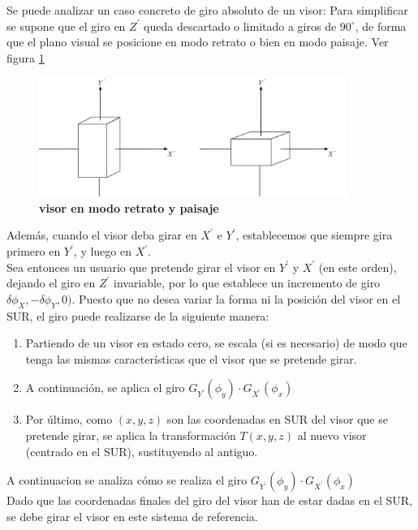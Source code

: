 Se puede analizar un caso concreto de giro absoluto de un visor: Para simplificar se supone que el giro en $Z^{\prime}$ queda descartado o limitado a giros de $90^{\circ}$, de forma que el plano visual se posicione en modo retrato o bien en modo paisaje. Ver figura \ref{geo-visor8}

\begin{figure}[h]
\includegraphics[width=10cm]{Img/GEO/geo-visor-8.png}
\centering
    \caption{\footnotesize{\textbf{visor en modo retrato y paisaje}}}
    \label{geo-visor8}
\end{figure}

Además, cuando el visor deba girar en $X^{\prime}$ e $Y^{\prime}$, establecemos que siempre gira primero en $Y^{\prime}$, y luego en $X^{\prime}$.\\
Sea entonces un usuario que pretende girar el visor en $Y^{\prime}$ y $X^{\prime}$ (en este orden), dejando el giro en $Z^{\prime}$ invariable, por lo que establece un incremento de giro ${{\delta}{\phi}}_X, -{{\delta}{\phi}}_Y, 0)$. Puesto que no desea variar la forma ni la posición del visor en el SUR, el giro puede realizarse de la siguiente manera:
\begin{enumerate}
    \item Partiendo de un visor en estado cero, se escala (si es necesario) de modo que tenga las mismas características que el visor que se pretende girar.
    \item A continuación, se aplica el giro $G_{Y^{\prime}}({\phi}_y) \cdot G_{X^{\prime}}({\phi}_x)$
    \item Por último, como $(x, y, z)$ son las coordenadas en SUR del visor que se pretende girar, se aplica la transformación $T(x, y, z)$ al nuevo visor (centrado en el SUR), sustituyendo al antiguo.
\end{enumerate}

A continuacion se analiza cómo se realiza el giro $G_{Y^{\prime}}({\phi}_y) \cdot G_{X^{\prime}}({\phi}_x)$\\
Dado que las coordenadas finales del giro del visor han de estar dadas en el SUR, se debe girar el visor en este sistema de referencia.

